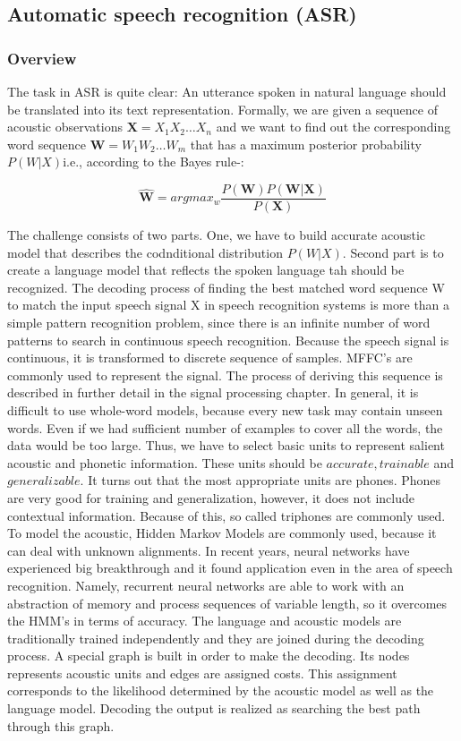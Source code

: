 \subsection{Automatic speech recognition (ASR)}
\subsubsection*{Overview}
The task in ASR is quite clear: An utterance spoken in natural language should be translated into its text representation.
Formally, we are given a sequence of acoustic observations $\textbf{X} = X_1X_2\dots X_n$ and we want to find out the corresponding word sequence $\textbf{W} = W_1W_2\dots W_m$ that has a maximum posterior probability $P(W | X)$i.e., according to the Bayes rule-:
\begin{center}
\begin{equation}
\hat{\textbf{W}} = argmax_w \frac{P(\textbf{W})P(\textbf{W}|\textbf{X})}{P(\textbf{X})}
\end{equation}
\end{center}
The challenge consists of two parts.
One, we have to build accurate acoustic model that describes the codnditional distribution $P(W|X)$.
Second part is to create a language model that reflects the spoken language tah should be recognized.
The decoding process of finding the best matched word sequence
W to match the input speech signal X in speech recognition systems is more than a simple
pattern recognition problem, since there is an infinite
number of word patterns to search in continuous speech recognition.
Because the speech signal is continuous, it is transformed to discrete sequence of samples.
MFFC's are commonly used to represent the signal.
The process of deriving this sequence is described in further detail in the signal processing chapter.
In general, it is difficult to use whole-word models, because every new task may contain unseen words.
Even if we had sufficient number of examples to cover all the words, the data would be too large.
Thus, we have to select basic units to represent salient acoustic and phonetic information.
These units should be $accurate, trainable$ and $generalizable$.
It turns out that the most appropriate units are phones.
Phones are very good for training and generalization, however, it does not include contextual information.
Because of this, so called triphones are commonly used.
To model the acoustic, Hidden Markov Models are commonly used, because it can deal with unknown alignments.
In recent years, neural networks have experienced big breakthrough and it found application even in the area of speech recognition.
Namely, recurrent neural networks are able to work with an abstraction of memory and process sequences of variable length, so it overcomes the HMM's in terms of accuracy.
The language and acoustic models are traditionally trained independently and they are joined during the decoding process.
A special graph is built in order to make the decoding.
Its nodes represents acoustic units and edges are assigned costs.
This assignment corresponds to the likelihood determined by the acoustic model as well as the language model.
Decoding the output is realized as searching the best path through this graph.

